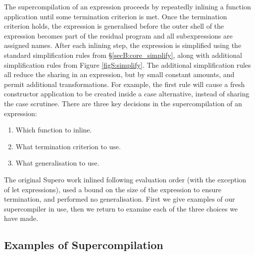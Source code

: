 The supercompilation of an expression proceeds by repeatedly inlining a function application until some termination criterion is met. Once the termination criterion holds, the expression is generalised before the outer shell of the expression becomes part of the residual program and all subexpressions are assigned names. After each inlining step, the expression is simplified using the standard simplification rules from \S\ref{secB:core_simplify}, along with additional simplification rules from Figure \ref{figS:simplify}. The additional simplification rules all reduce the sharing in an expression, but by small constant amounts, and permit additional transformations. For example, the first rule will cause a fresh constructor application to be created inside a case alternative, instead of sharing the case scrutinee. There are three key decisions in the supercompilation of an expression:

\begin{enumerate}
\item Which function to inline.
\item What termination criterion to use.
\item What generalisation to use.
\end{enumerate}

The original Supero work \cite{me:supero_ifl} inlined following evaluation order (with the exception of let expressions), used a bound on the size of the expression to ensure termination, and performed no generalisation. First we give examples of our supercompiler in use, then we return to examine each of the three choices we have made.

\subsection{Examples of Supercompilation}

